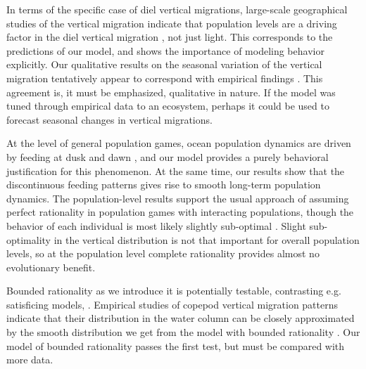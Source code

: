 In terms of the specific case of diel vertical migrations, large-scale geographical studies of the vertical migration indicate that population levels are a driving factor in the diel vertical migration \citep{klevjer2016large}, not just light. This corresponds to the predictions of our model, and shows the importance of modeling behavior explicitly. Our qualitative results on the seasonal variation of the vertical migration tentatively appear to correspond with empirical findings \citep{wang2014seasonal, beaugrand2001geographical, colebrook1979continuous}. This agreement is, it must be emphasized, qualitative in nature. If the model was tuned through empirical data to an ecosystem, perhaps it could be used to forecast seasonal changes in vertical migrations.

At the level of general population games, ocean population dynamics are driven by feeding at dusk and dawn \citep{benoit2014critical}, and our model provides a purely behavioral justification for this phenomenon. At the same time, our results show that the discontinuous feeding patterns gives rise to smooth long-term population dynamics. The population-level results support the usual approach of assuming perfect rationality in population games with interacting populations, though the behavior of each individual is most likely slightly sub-optimal \citep{hurly1999context}. Slight sub-optimality in the vertical distribution is not that important for overall population levels, so at the population level complete rationality provides almost no evolutionary benefit.

Bounded rationality as we introduce it is potentially testable, contrasting e.g. satisficing models, \citep{nonacs1993satisficing}. Empirical studies of copepod vertical migration patterns indicate that their distribution in the water column can be closely approximated by the smooth distribution we get from the model with bounded rationality \citep{hay1991zooplankton, visser2001observations}. Our model of bounded rationality passes the first test, but must be compared with more data.

